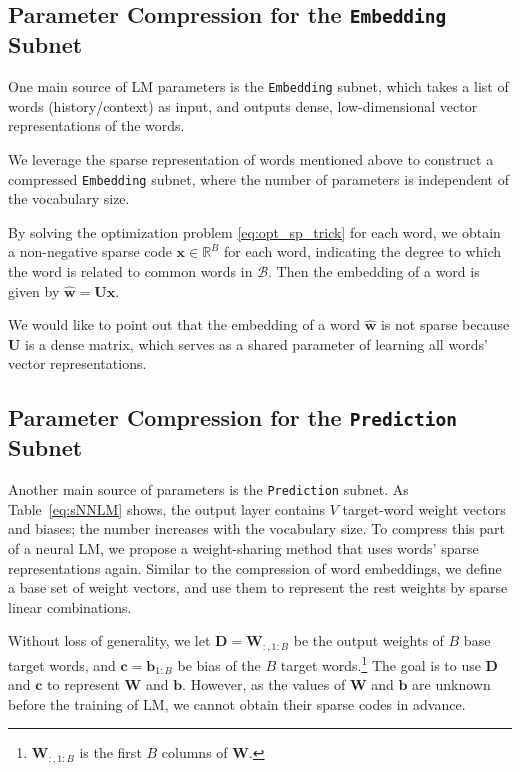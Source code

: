 \documentclass[11pt]{article}
\renewcommand{\vector}[1]{\bm{#1}}
\def\Embedding{\texttt{Embedding}}
\def\Prediction{\texttt{Prediction}}
\begin{document}
\subsection{Parameter Compression for the \Embedding{} Subnet}
\label{ss:embedding}
One main source of LM parameters is the \Embedding{} subnet, which takes a list of words (history/context) as input, and outputs dense, low-dimensional vector representations of the words.

We leverage the sparse representation of words mentioned above
to construct a compressed \Embedding{} subnet, where
the number of parameters is independent of the vocabulary size.

By solving the optimization problem \eqref{eq:opt_sp_trick} for each word, we obtain
a non-negative sparse code $\vector{x}\in\mathbb{R}^{B}$ for each word, indicating the degree to which the word is related to common words in $\mathcal{B}$.
Then the embedding of a word is given by $\hat{\vector{w}}=\vector{U}\vector{x}$.

We would like to point out that the embedding of a word $\hat{\vector{w}}$ is not sparse because $\vector{U}$ is a dense matrix, which serves as a shared parameter of learning all words' vector representations.

\subsection{Parameter Compression for the \Prediction{} Subnet} \label{ss:prediction}
Another main source of parameters is the \Prediction{} subnet.
As Table~\ref{eq:sNNLM} shows, the output layer contains $V$ target-word weight vectors and biases; the number increases with the vocabulary size.
To compress this part of a neural LM, we propose a weight-sharing method that uses words' sparse
representations again.
Similar to the compression of word embeddings, we define
a base set of weight vectors, and use them to represent the rest weights by sparse linear combinations.

Without loss of generality, we let $\vector{D} = \vector{W}_{:,1:B}$ be the output weights of $B$ base target words, and  $\vector{c} = \vector{b}_{1:B}$ be bias of the $B$ target words.\footnote{
$\vector{W}_{:,1:B}$ is the first $B$ columns of $\vector{W}$.} The goal is to use $\vector{D}$ and $\vector{c}$ to represent $\vector{W}$ and $\vector{b}$.
However, as the values of $\bm W$ and $\bm b$ are unknown before the training of LM, we cannot obtain their sparse codes in advance.
\end{document}
